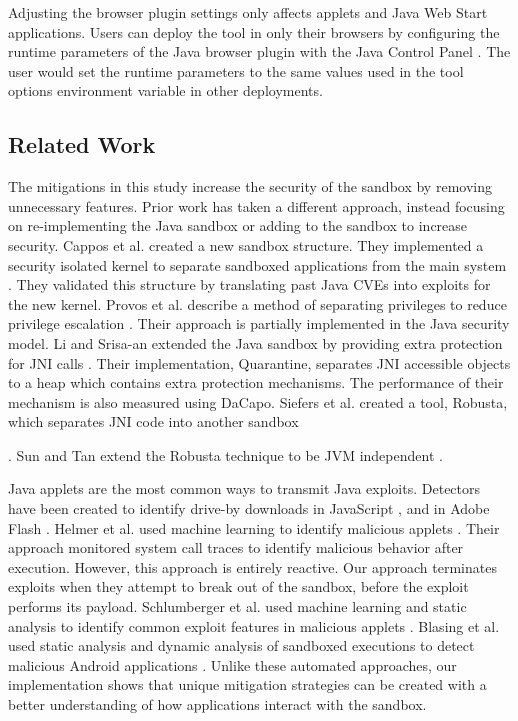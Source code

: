 \documentclass{sig-alternate}
\begin{document}
Adjusting the browser plugin settings only affects applets and Java
Web Start applications. Users can deploy the tool in only their browsers
by configuring the runtime parameters of the Java browser plugin with
the Java Control Panel \cite{_java_control_panel}. The user would
set the runtime parameters to the same values used in the tool options
environment variable in other deployments.


\subsection{Related Work}\label{sub:Related-Work-Mitigation}

The mitigations in this study increase the security of the sandbox
by removing unnecessary features. Prior work has taken a different
approach, instead focusing on re-implementing the Java sandbox or
adding to the sandbox to increase security. Cappos et al. created
a new sandbox structure. They implemented a security isolated kernel
to separate sandboxed applications from the main system \cite{cappos_retaining_2010}.
They validated this structure by translating past Java CVEs into exploits
for the new kernel. Provos et al. describe a method of separating
privileges to reduce privilege escalation \cite{Provos-PrivilegeEscalation}.
Their approach is partially implemented in the Java security model.
Li and Srisa-an extended the Java sandbox by providing extra protection
for JNI calls \cite{li_quarantine:_2011}. Their implementation, Quarantine,
separates JNI accessible objects to a heap which contains extra protection
mechanisms. The performance of their mechanism is also measured using
DaCapo. Siefers et al. created a tool, Robusta, which separates JNI
code into another sandbox \cite{siefers_robusta:_2010}%

. Sun and Tan extend the Robusta technique to be JVM independent \cite{sun_jvm-portable_2012}. 

Java applets are the most common ways to transmit Java exploits. Detectors
have been created to identify drive-by downloads in JavaScript \cite{cova_detection_2010},
and in Adobe Flash \cite{ford_analyzing_2009}. Helmer et al. used
machine learning to identify malicious applets \cite{helmer_anomalous_2001}.
Their approach monitored system call traces to identify malicious
behavior after execution. However, this approach is entirely reactive.
Our approach terminates exploits when they attempt to break out of
the sandbox, before the exploit performs its payload. Schlumberger
et al. used machine learning and static analysis to identify common
exploit features in malicious applets \cite{schlumberger_jarhead_2012}.
Blasing et al. used static analysis and dynamic analysis of sandboxed
executions to detect malicious Android applications \cite{Blasing-AndriodSandbox}.
Unlike these automated approaches, our implementation shows that unique
mitigation strategies can be created with a better understanding of
how applications interact with the sandbox. 
\end{document}
